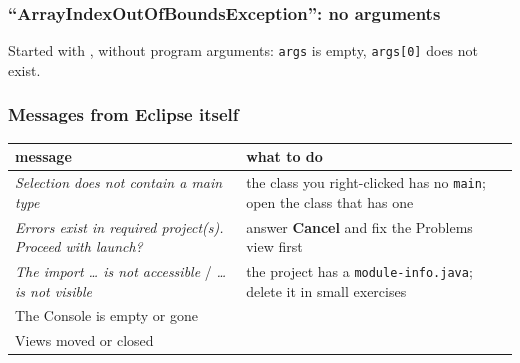 \documentclass[aspectratio=169,10pt,compress]{beamer}
\begin{document}
\begin{frame}[t,fragile] \frametitle{``ArrayIndexOutOfBoundsException'': no arguments}

  \vspace{0.2em}
  \small Started with , without program arguments: \texttt{args} is empty, \texttt{args[0]} does not exist.
\end{frame}




\begin{frame}[t,fragile] \frametitle{Messages from Eclipse itself}
  \begin{center}\small
  \begin{tabular}{L{0.42\textwidth}L{0.5\textwidth}}
    \toprule
    \textbf{message}                                          & \textbf{what to do} \\
    \midrule
    \emph{Selection does not contain a main type}             & the class you right-clicked has no \texttt{main}; open the class that has one \\
    \emph{Errors exist in required project(s). Proceed with launch?} & answer \textbf{Cancel} and fix the Problems view first \\
    \emph{The import \dots{} is not accessible} / \emph{\dots{} is not visible} & the project has a \texttt{module-info.java}; delete it in small exercises \\
    The Console is empty or gone                              &  \\
    Views moved or closed                                     &  \\
    \bottomrule
  \end{tabular}
  \end{center}
\end{frame}

\end{document}
